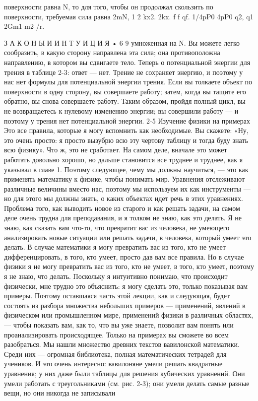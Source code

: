 \documentclass[10pt,oneside]{article}
\begin{document}
поверхности равна N, то для того, чтобы он продолжал скользить по поверхности, требуемая сила равна 2mN, 1 2 kx2. 2kx. f f qf. 1/4pP0 4pP0 q2, q1 2Gm1  m2  /r.\par

З А К О Н Ы  И  И Н Т У И Ц И Я • 6 9 умноженная на N. Вы можете легко сообразить, в какую сторону направлена эта сила; она противоположна направлению, в котором вы сдвигаете тело. Теперь о потенциальной энергии для трения в таблице 2-3: ответ --- нет. Трение не сохраняет энергию, и поэтому у нас нет формулы для потенциальной энергии трения. Если вы толкаете объект по поверхности в одну сторону, вы совершаете работу; затем, когда вы тащите его обратно, вы снова совершаете работу. Таким образом, пройдя полный цикл, вы не возвращаетесь к нулевому изменению энергии; вы совершили работу --- и поэтому у трения нет потенциальной энергии. 2-5 Изучение физики на примерах Это все правила, которые я могу вспомнить как необходимые. Вы скажете: «Ну, это очень просто: я просто вызубрю всю эту чертову таблицу и тогда буду знать всю физику». Что ж, это не сработает. На самом деле, вначале это может работать довольно хорошо, но дальше становится все труднее и труднее, как я указывал в главе 1. Поэтому следующее, чему мы должны научиться, --- это как применять математику к физике, чтобы понимать мир. Уравнения отслеживают различные величины вместо нас, поэтому мы используем их как инструменты --- но для этого мы должны знать, о каких объектах идет речь в этих уравнениях. Проблема того, как выводить новое из старого и как решать задачи, на самом деле очень трудна для преподавания, и я толком не знаю, как это делать. Я не знаю, как сказать вам что-то, что превратит вас из человека, не умеющего анализировать новые ситуации или решать задачи, в человека, который умеет это делать. В случае математики я могу превратить вас из того, кто не умеет дифференцировать, в того, кто умеет, просто дав вам все правила. Но в случае физики я не могу превратить вас из того, кто не умеет, в того, кто умеет, поэтому я не знаю, что делать. Поскольку я интуитивно понимаю, что происходит физически, мне трудно это объяснить: я могу сделать это, только показывая вам примеры. Поэтому оставшаяся часть этой лекции, как и следующая, будет состоять из разбора множества небольших примеров --- применений, явлений в физическом или промышленном мире, применений физики в различных областях, --- чтобы показать вам, как то, что вы уже знаете, позволит вам понять или проанализировать происходящее. Только на примерах вы сможете во всем разобраться. Мы нашли множество древних текстов вавилонской математики. Среди них --- огромная библиотека, полная математических тетрадей для учеников. И это очень интересно: вавилоняне умели решать квадратные уравнения; у них даже были таблицы для решения кубических уравнений. Они умели работать с треугольниками (см. рис. 2-3); они умели делать самые разные вещи, но они никогда не записывали\par
\end{document}
